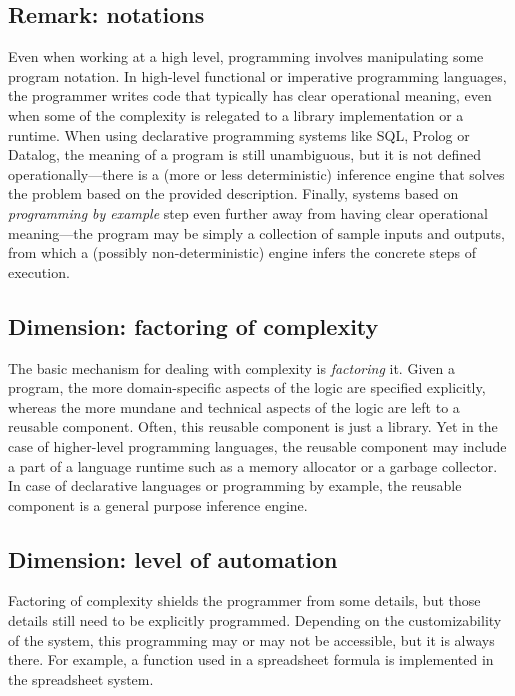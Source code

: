 \documentclass[ twoside,openright,titlepage,numbers=noenddot,headinclude,footinclude,cleardoublepage=empty,abstract=on,
                BCOR=5mm,paper=a4,fontsize=11pt
                ]{scrreprt}
\theoremstyle{definition}
\begin{document}
\hypertarget{remark-notations}{\subsection{Remark: notations}\label{remark-notations}}

Even when working at a high level, programming involves manipulating
some program notation. In high-level functional or imperative
programming languages, the programmer writes code that typically has
clear operational meaning, even when some of the complexity is relegated
to a library implementation or a runtime. When using declarative
programming systems like SQL, Prolog or Datalog, the meaning of a
program is still unambiguous, but it is not defined
operationally---there is a (more or less deterministic) inference engine
that solves the problem based on the provided description. Finally,
systems based on \emph{programming by example} step even further away
from having clear operational meaning---the program may be simply a
collection of sample inputs and outputs, from which a (possibly
non-deterministic) engine infers the concrete steps of execution.

\hypertarget{dimension-factoring-of-complexity}{\subsection{Dimension: factoring of
complexity}\label{dimension-factoring-of-complexity}}

The basic mechanism for dealing with complexity is \emph{factoring} it.
Given a program, the more domain-specific aspects of the logic are
specified explicitly, whereas the more mundane and technical aspects of
the logic are left to a reusable component. Often, this reusable
component is just a library. Yet in the case of higher-level programming
languages, the reusable component may include a part of a language
runtime such as a memory allocator or a garbage collector. In case of
declarative languages or programming by example, the reusable component
is a general purpose inference engine.

\hypertarget{dimension-level-of-automation}{\subsection{Dimension: level of
automation}\label{dimension-level-of-automation}}

Factoring of complexity shields the programmer from some details, but
those details still need to be explicitly programmed. Depending on the
customizability of the system, this programming may or may not be
accessible, but it is always there. For example, a function used in a
spreadsheet formula is implemented in the spreadsheet system.
\end{document}
